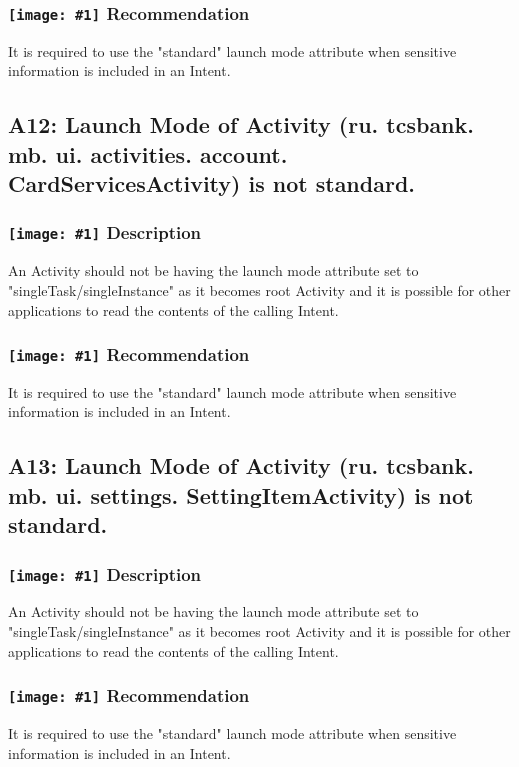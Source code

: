\documentclass[12p]{article}
\newcommand{\icon}[1]{\texttt{[image: \#1]}}
\begin{document}
\subsubsection*{\protect\icon{/home/miki/Documents/GITHUB/AndroidPermissions/python/vulns/report_icons/basic_todo.png} Recommendation}
It is required to use the "standard" launch mode attribute when sensitive information is included in an Intent.
\subsection{A12: Launch Mode of Activity (ru. tcsbank. mb. ui. activities. account. CardServicesActivity) is not standard.}
\subsubsection*{\protect\icon{/home/miki/Documents/GITHUB/AndroidPermissions/python/vulns/report_icons/basic_sheet.png} Description}
An Activity should not be having the launch mode attribute set to "singleTask/singleInstance" as it becomes root Activity and it is possible for other applications to read the contents of the calling Intent.
\subsubsection*{\protect\icon{/home/miki/Documents/GITHUB/AndroidPermissions/python/vulns/report_icons/basic_todo.png} Recommendation}
It is required to use the "standard" launch mode attribute when sensitive information is included in an Intent.
\subsection{A13: Launch Mode of Activity (ru. tcsbank. mb. ui. settings. SettingItemActivity) is not standard.}
\subsubsection*{\protect\icon{/home/miki/Documents/GITHUB/AndroidPermissions/python/vulns/report_icons/basic_sheet.png} Description}
An Activity should not be having the launch mode attribute set to "singleTask/singleInstance" as it becomes root Activity and it is possible for other applications to read the contents of the calling Intent.
\subsubsection*{\protect\icon{/home/miki/Documents/GITHUB/AndroidPermissions/python/vulns/report_icons/basic_todo.png} Recommendation}
It is required to use the "standard" launch mode attribute when sensitive information is included in an Intent.
\end{document}
